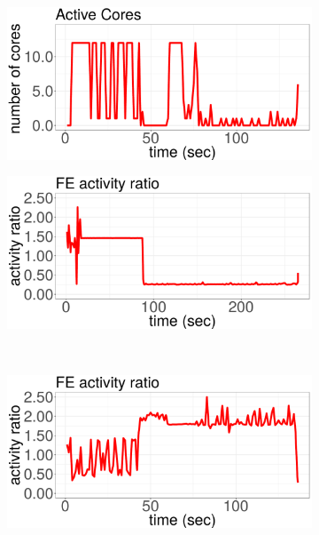 \begin{figure}[!ht]
\begin{subfigure}[b]{.45\textwidth}
  \end{subfigure}%
~
	\begin{subfigure}[b]{.45\textwidth}
  	\includegraphics[width=\textwidth]{power_aware_job_scheduling/figures/activity_ratios/bodytrack_CORES}
  \end{subfigure}%
\vspace{0.1cm}
	\begin{subfigure}[b]{.45\textwidth}
  	\includegraphics[width=\textwidth]{power_aware_job_scheduling/figures/activity_ratios/blackscholes_IPC}
  \end{subfigure}%
~
	\begin{subfigure}[b]{.45\textwidth}
  	\includegraphics[width=\textwidth]{power_aware_job_scheduling/figures/activity_ratios/bodytrack_IPC}

\end{subfigure}
\end{figure}
